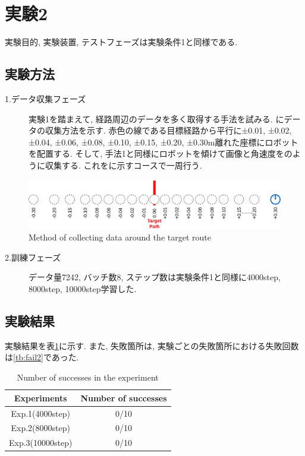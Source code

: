 \newpage
\section{実験2}
実験目的, 実験装置, テストフェーズは実験条件1と同様である.
\subsection{実験方法}
\begin{description}
  \item[1.データ収集フェーズ]実験1を踏まえて, 経路周辺のデータを多く取得する手法を試みる. にデータの収集方法を示す. 赤色の線である目標経路から平行に±0.01, ±0.02, ±0.04, ±0.06, ±0.08, ±0.10, ±0.15, ±0.20, ±0.30m離れた座標にロボットを配置する. そして, 手法1と同様にロボットを傾けて画像と角速度をのように収集する. これをに示すコースで一周行う.  
\end{description}

\begin{figure}[h]
  \centering
  \includegraphics[keepaspectratio, scale=0.18]{images/collect-data.png}
  \caption{Method of collecting data around the target route}
  \label{Fig:collect-data}
  \end{figure}

\begin{description}
  \item[2.訓練フェーズ]データ量7242, バッチ数8, ステップ数は実験条件1と同様に4000step, 8000step, 10000step学習した. 
\end{description}

\subsection{実験結果}
実験結果を表\ref{tb:exp2}に示す. また, 失敗箇所は, 実験ごとの失敗箇所における失敗回数は\ref{tb:fail2}であった. 

\begin{table}[h]
  \centering
  \begin{tabular}{|c|c|} \hline
    Experiments & Number of successes \\ \hline
    Exp.1(4000step) & 0/10 \\ \hline
    Exp.2(8000step) & 0/10 \\ \hline
    Exp.3(10000step) & 0/10 \\ \hline
  \end{tabular}
  \caption{Number of successes in the experiment}
  \label{tb:exp2}
\end{table}

